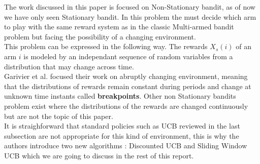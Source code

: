 The work discussed in this paper is focused on Non-Stationary bandit, as of now we have only seen Stationary bandit. In this problem the must decide which arm to play with the same reward system as in the classic Multi-armed bandit problem but facing the possibility of a changing environment.\\

This problem can be expressed in the following way. The rewards $X_s(i)$ of an arm $i$ is modeled by an independant sequence of random variables from a distribution that may change across time.\\

Garivier et al. focused their work on abruptly changing environment, meaning that the distributions of rewards remain constant during periods and change at unknown time instants called \textbf{breakpoints}. Other non Stationary bandits problem exist where the distributions of the rewards are changed continuously but are not the topic of this paper.\\

It is straighforward that standard policies such as UCB reviewed in the last subsection are not appropriate for this kind of environment, this is why the authors introduce two new algorithms : Discounted UCB and Sliding Window UCB which we are going to discuss in the rest of this report.